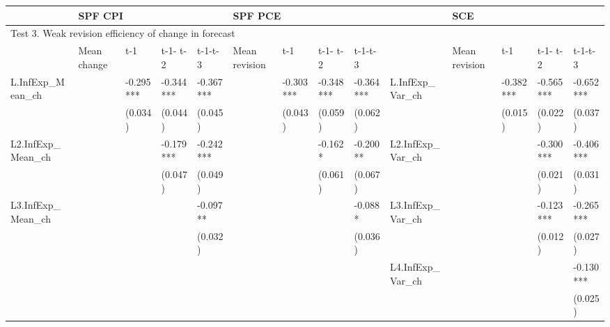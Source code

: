 \documentclass[]{article}
\begin{document}
\begin{adjustbox}{width={22cm},totalheight={12cm},angle=90}\label{WeakRevEfficiency}
	\begin{tabular}{llllllllllllll}
		\hline 
		& \multicolumn{4}{l}{SPF CPI}                     & \multicolumn{4}{l}{SPF PCE}                       &                      & \multicolumn{4}{l}{SCE}                           \\
		\hline 
		\multicolumn{14}{l}{Test 3. Weak revision efficiency of change in forecast}                                                                                                                                    \\
		\hline 
		& Mean change & t-1       & t-1- t-2  & t-1-t-3   & Mean revision & t-1       & t-1- t-2  & t-1-t-3   &                      & Mean revision & t-1       & t-1- t-2  & t-1-t-3   \\
		\hline 
		L.InfExp\_Mean\_ch   &             & -0.295*** & -0.344*** & -0.367*** &               & -0.303*** & -0.348*** & -0.364*** & L.InfExp\_Var\_ch    &               & -0.382*** & -0.565*** & -0.652*** \\
		&             & (0.034)   & (0.044)   & (0.045)   &               & (0.043)   & (0.059)   & (0.062)   &                      &               & (0.015)   & (0.022)   & (0.037)   \\
		L2.InfExp\_Mean\_ch  &             &           & -0.179*** & -0.242*** &               &           & -0.162*   & -0.200**  & L2.InfExp\_Var\_ch   &               &           & -0.300*** & -0.406*** \\
		&             &           & (0.047)   & (0.049)   &               &           & (0.061)   & (0.067)   &                      &               &           & (0.021)   & (0.031)   \\
		L3.InfExp\_Mean\_ch  &             &           &           & -0.097**  &               &           &           & -0.088*   & L3.InfExp\_Var\_ch   &               &           & -0.123*** & -0.265*** \\
		&             &           &           & (0.032)   &               &           &           & (0.036)   &                      &               &           & (0.012)   & (0.027)   \\
		&             &           &           &           &               &           &           &           & L4.InfExp\_Var\_ch   &               &           &           & -0.130*** \\
		&             &           &           &           &               &           &           &           &                      &               &           &           & (0.025)   \\

\end{tabular}
\end{adjustbox}
\end{document}

